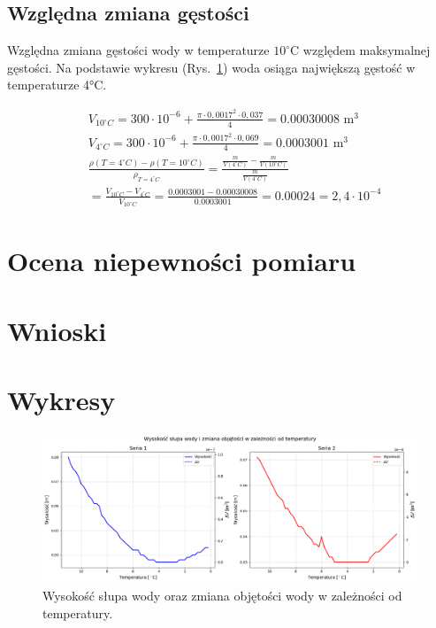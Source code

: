 \documentclass[a4paper,12pt]{article}
\begin{document}
\subsection{Względna zmiana gęstości}

Względna zmiana gęstości wody w temperaturze $10^\circ$C względem maksymalnej gęstości. Na podstawie wykresu (Rys.~\ref{fig:height_vs_temperature}) woda osiąga największą gęstość w temperaturze 4°C.

\begin{align*}
     & V_{10^\circ C} = 300 \cdot 10^{-6} + \frac{\pi \cdot 0{,}0017^2 \cdot 0{,}037}{4} = 0.00030008 \text{ m}^3                                          \\
     & V_{4^\circ C} = 300 \cdot 10^{-6} + \frac{\pi \cdot 0{,}0017^2 \cdot 0{,}069}{4} = 0.0003001 \text{ m}^3                                            \\
     & \frac{\rho(T=4^\circ C) - \rho(T=10^\circ C)}{\rho_{T=4^\circ C}} = \frac{\frac{m}{V(4^\circ C)} - \frac{m}{V(10^\circ C)}}{\frac{m}{V(4^\circ C)}} \\
     & = \frac{V_{10^\circ C} - V_{4^\circ C}}{V_{10^\circ C}} = \frac{0.0003001 - 0.00030008}{0.0003001} = 0.00024 = 2{,}4 \cdot 10^{-4}
\end{align*}

\section{Ocena niepewności pomiaru}

\section{Wnioski}

\newpage
\section{Wykresy}

\begin{figure}[H]
    \centering
    \includegraphics[width=0.9\textheight,angle=90]{height_vs_temperature.png}
    \caption{Wysokość słupa wody oraz zmiana objętości wody w zależności od temperatury.}
    \label{fig:height_vs_temperature}
\end{figure}




\end{document}
